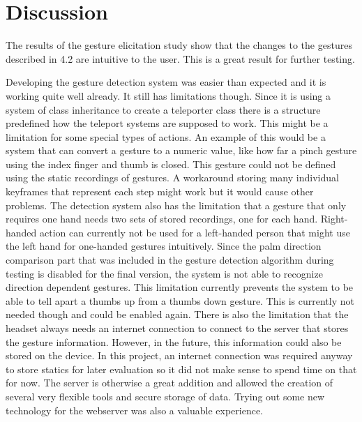 \chapter{Discussion}

The results of the gesture elicitation study show that the changes to the gestures described in 4.2 are intuitive to the user. %
This is a great result for further testing.


Developing the gesture detection system was easier than expected and it is working quite well already. It still has limitations though. Since it is using a system of class inheritance to create a teleporter class there is a structure predefined how the teleport systems are supposed to work. This might be a limitation for some special types of actions. An example of this would be a system that can convert a gesture to a numeric value, like how far a pinch gesture using the index finger and thumb is closed. This gesture could not be defined using the static recordings of gestures. A workaround storing many individual keyframes that represent each step might work but it would cause other problems. The detection system also has the limitation that a gesture that only requires one hand needs two sets of stored recordings, one for each hand. Right-handed action can currently not be used for a left-handed person that might use the left hand for one-handed gestures intuitively. Since the palm direction comparison part that was included in the gesture detection algorithm during testing is disabled for the final version, the system is not able to recognize direction dependent gestures. This limitation currently prevents the system to be able to tell apart a thumbs up from a thumbs down gesture. This is currently not needed though and could be enabled again.
There is also the limitation that the headset always needs an internet connection to connect to the server that stores the gesture information. However, in the future, this information could also be stored on the device. In this project, an internet connection was required anyway to store statics for later evaluation so it did not make sense to spend time on that for now. The server is otherwise a great addition and allowed the creation of several very flexible tools and secure storage of data. Trying out some new technology for the webserver was also a valuable experience. 